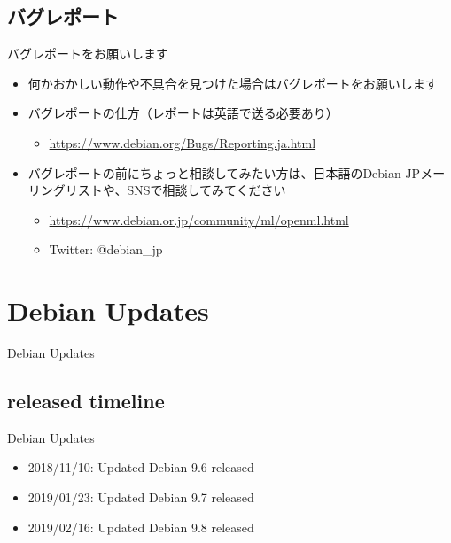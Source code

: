\subsection{バグレポート}

\begin{frame}{バグレポートをお願いします}%
  \begin{itemize}
  \item 何かおかしい動作や不具合を見つけた場合はバグレポートをお願いします
  \item バグレポートの仕方（レポートは英語で送る必要あり）
    \begin{itemize}
    \item \url{https://www.debian.org/Bugs/Reporting.ja.html}
    \end{itemize}
  \item バグレポートの前にちょっと相談してみたい方は、日本語のDebian JPメーリングリストや、SNSで相談してみてください
    \begin{itemize}
    \item \url{https://www.debian.or.jp/community/ml/openml.html}
    \item Twitter: @debian\_jp
    \end{itemize}
  \end{itemize}
\end{frame}


\section{Debian Updates}


\begin{frame}
  \begin{center}\Huge{Debian Updates}\end{center}
\end{frame}


\subsection{released timeline}

\begin{frame}{Debian Updates}%

\begin{itemize}
  \item 2018/11/10:  Updated Debian 9.6  released
  \item 2019/01/23:  Updated Debian 9.7  released
  \item 2019/02/16:  Updated Debian 9.8  released
\end{itemize}

\end{frame}



